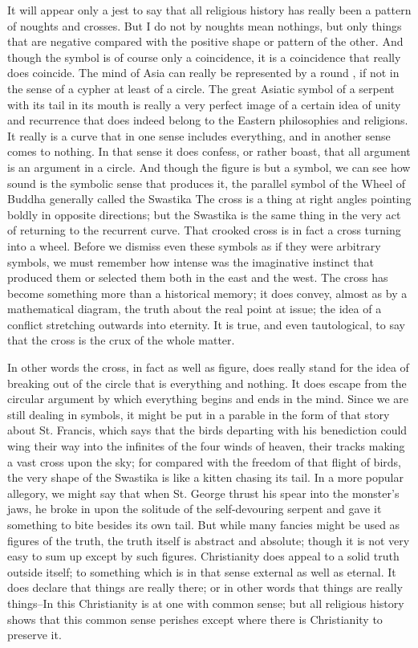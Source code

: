 It will appear only a jest to say that all religious history has really been a pattern of noughts and crosses. But I do not by noughts mean nothings, but only things that are negative compared with the positive shape or pattern of the other. And though the symbol is of course only a coincidence, it is a coincidence that really does coincide. The mind of Asia can really be represented by a round , if not in the sense of a cypher at least of a circle. The great Asiatic symbol of a serpent with its tail in its mouth is really a very perfect image of a certain idea of unity and recurrence that does indeed belong to the Eastern philosophies and religions. It really is a curve that in one sense includes everything, and in another sense comes to nothing. In that sense it does confess, or rather boast, that all argument is an argument in a circle. And though the figure is but a symbol, we can see how sound is the symbolic sense that produces it, the parallel symbol of the Wheel of Buddha generally called the Swastika The cross is a thing at right angles pointing boldly in opposite directions; but the Swastika is the same thing in the very act of returning to the recurrent curve. That crooked cross is in fact a cross turning into a wheel. Before we dismiss even these symbols as if they were arbitrary symbols, we must remember how intense was the imaginative instinct that produced them or selected them both in the east and the west. The cross has become something more than a historical memory; it does convey, almost as by a mathematical diagram, the truth about the real point at issue; the idea of a conflict stretching outwards into eternity. It is true, and even tautological, to say that the cross is the crux of the whole matter.

In other words the cross, in fact as well as figure, does really stand for the idea of breaking out of the circle that is everything and nothing. It does escape from the circular argument by which everything begins and ends in the mind. Since we are still dealing in symbols, it might be put in a parable in the form of that story about St. Francis, which says that the birds departing with his benediction could wing their way into the infinites of the four winds of heaven, their tracks making a vast cross upon the sky; for compared with the freedom of that flight of birds, the very shape of the Swastika is like a kitten chasing its tail. In a more popular allegory, we might say that when St. George thrust his spear into the monster's jaws, he broke in upon the solitude of the self-devouring serpent and gave it something to bite besides its own tail. But while many fancies might be used as figures of the truth, the truth itself is abstract and absolute; though it is not very easy to sum up except by such figures. Christianity does appeal to a solid truth outside itself; to something which is in that sense external as well as eternal. It does declare that things are really there; or in other words that things are really things--In this Christianity is at one with common sense; but all religious history shows that this common sense perishes except where there is Christianity to preserve it.

